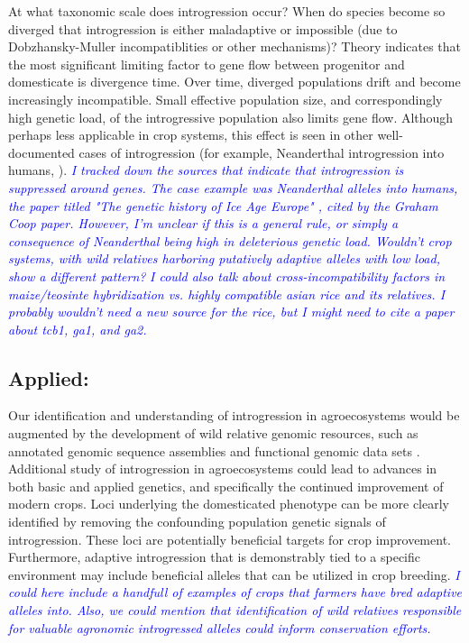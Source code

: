 \documentclass[11pt]{article}
\newcommand{\gmj}[1]{\textcolor{blue}{ \emph{\scriptsize  #1}} } %
\begin{document}
At what taxonomic scale does introgression occur?
When do species become so diverged that introgression is either maladaptive or impossible (due to  Dobzhansky-Muller incompatiblities or other mechanisms)?
Theory indicates that the most significant limiting factor to gene flow between progenitor and domesticate is divergence time.
Over time, diverged populations drift and become increasingly incompatible.
Small effective population size, and correspondingly high genetic load, of the introgressive population also limits gene flow.
Although perhaps less applicable in crop systems, this effect is seen in other well-documented cases of introgression (for example, Neanderthal introgression into humans, \cite{harris2016genetic}).
\gmj{I tracked down the sources that indicate that introgression is suppressed around genes.  The case example was Neanderthal alleles into humans, the paper titled "The genetic history of Ice Age Europe" \cite{fu2016genetic}, cited by the Graham Coop paper.  However, I'm unclear if this is a general rule, or simply a consequence of Neanderthal being high in deleterious genetic load.  Wouldn't crop systems, with wild relatives harboring putatively adaptive alleles with low load, show a different pattern?}
\gmj{I could also talk about cross-incompatibility factors in maize/teosinte hybridization vs. highly compatible asian rice and its relatives.  I probably wouldn't need a new source for the rice, but I might need to cite a paper about tcb1, ga1, and ga2.}













\subsection*{Applied:}
Our identification and understanding of introgression in agroecosystems would be augmented by the development of wild relative genomic resources, such as annotated genomic sequence assemblies and functional genomic data sets \cite{huang2012}.
Additional study of introgression in agroecosystems could lead to advances in both basic and applied genetics, and specifically the continued improvement of modern crops.
Loci underlying the domesticated phenotype can be more clearly identified by removing the confounding population genetic signals of introgression.
These loci are potentially beneficial targets for crop improvement.
Furthermore, adaptive introgression that is demonstrably tied to a specific environment may include beneficial alleles that can be utilized in crop breeding.
\gmj{I could here include a handfull of examples of crops that farmers have bred adaptive alleles into.  Also, we could mention that identification of wild relatives responsible for valuable agronomic introgressed alleles could inform conservation efforts.}
\end{document}
